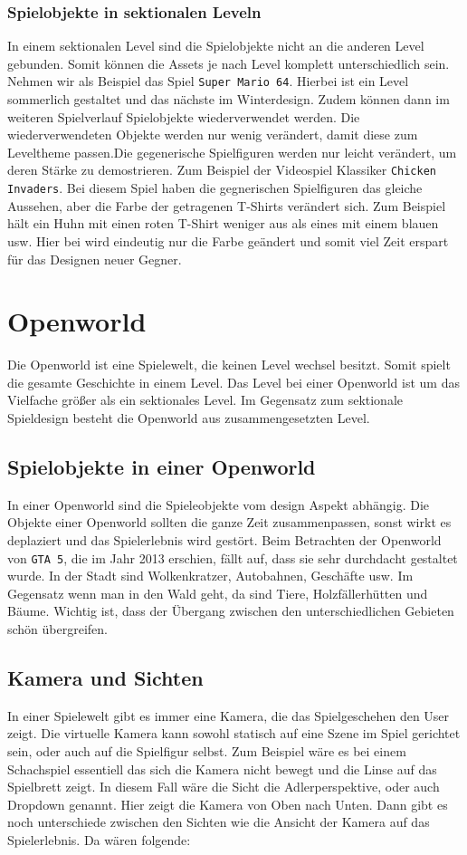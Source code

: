 \subsubsection{Spielobjekte in sektionalen Leveln}
In einem sektionalen Level sind die Spielobjekte nicht an die anderen Level gebunden. Somit können die Assets je nach Level komplett unterschiedlich sein. Nehmen wir als Beispiel das Spiel \verb+Super Mario 64+. Hierbei ist ein Level sommerlich gestaltet und das nächste im Winterdesign. Zudem können dann im weiteren Spielverlauf Spielobjekte wiederverwendet werden. Die wiederverwendeten Objekte werden nur wenig verändert, damit diese zum Leveltheme passen.Die gegenerische Spielfiguren werden nur leicht verändert, um deren Stärke zu demostrieren. Zum Beispiel der Videospiel Klassiker \verb+Chicken Invaders+. Bei diesem Spiel haben die gegnerischen Spielfiguren das gleiche Aussehen, aber die Farbe der getragenen T-Shirts verändert sich. Zum Beispiel hält ein Huhn mit einen roten T-Shirt weniger aus als eines mit einem blauen usw. Hier bei wird eindeutig nur die Farbe geändert und somit viel Zeit erspart für das Designen neuer Gegner.

\section{Openworld}
Die Openworld ist eine Spielewelt, die keinen Level wechsel besitzt. Somit spielt die gesamte Geschichte in einem Level. Das Level bei einer Openworld ist um das Vielfache größer als ein sektionales Level. Im Gegensatz zum sektionale Spieldesign besteht die Openworld aus zusammengesetzten Level.


\subsection{Spielobjekte in einer Openworld}
In einer Openworld sind die Spieleobjekte vom design Aspekt abhängig. Die Objekte einer Openworld sollten die ganze Zeit zusammenpassen, sonst wirkt es deplaziert und das Spielerlebnis wird gestört. Beim Betrachten der Openworld von \verb+GTA 5+, die im Jahr 2013 erschien, fällt auf, dass sie sehr durchdacht gestaltet wurde. In der Stadt sind Wolkenkratzer, Autobahnen, Geschäfte usw. Im Gegensatz wenn man in den Wald geht, da sind Tiere, Holzfällerhütten und Bäume. Wichtig ist, dass der Übergang zwischen den unterschiedlichen Gebieten schön übergreifen. 


\subsection{Kamera und Sichten}
In einer Spielewelt gibt es immer eine Kamera, die das Spielgeschehen den User  zeigt. Die virtuelle Kamera kann sowohl statisch auf eine Szene im Spiel gerichtet sein, oder auch auf die Spielfigur selbst. Zum Beispiel wäre es bei einem Schachspiel essentiell das sich die Kamera nicht bewegt und die Linse auf das Spielbrett zeigt. In diesem Fall wäre die Sicht die Adlerperspektive, oder auch Dropdown genannt. Hier zeigt die Kamera von Oben nach Unten. Dann gibt es noch unterschiede zwischen den Sichten wie die Ansicht der Kamera auf das Spielerlebnis. Da wären folgende:

